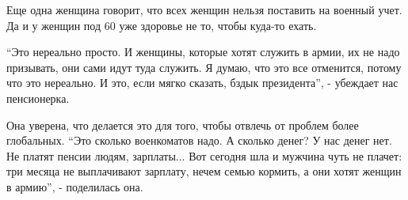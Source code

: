 \begin{multicols}{2}

Еще одна женщина говорит, что всех женщин нельзя поставить на военный учет. Да
и у женщин под 60 уже здоровье не то, чтобы куда-то ехать. 

\enquote{Это нереально просто. И женщины, которые хотят служить в армии, их не надо
призывать, они сами идут туда служить. Я думаю, что это все отменится, потому
что это нереально. И это, если мягко сказать, бздык президента}, - убеждает нас
пенсионерка.

Она уверена, что делается это для того, чтобы отвлечь от проблем более
глобальных. \enquote{Это сколько военкоматов надо. А сколько денег? У нас денег нет. Не
платят пенсии людям, зарплаты... Вот сегодня шла и мужчина чуть не плачет: три
месяца не выплачивают зарплату, нечем семью кормить, а они хотят женщин в
армию}, - поделилась она.

\end{multicols} %
